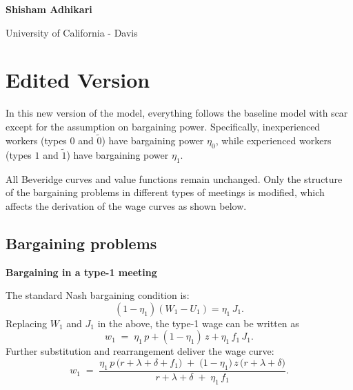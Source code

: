 \documentclass[12pt]{article} %
\theoremstyle{definition}
\begin{document}



\vspace{0.5cm}

\noindent \normalsize  \textbf{Shisham Adhikari}

\noindent University of California - Davis

\vspace{0.7cm}


\normalsize

\section*{Edited Version}

In this new version of the model, everything follows the baseline model with scar except for the assumption on bargaining power. Specifically, inexperienced workers (types \(0\) and \(\tilde{0}\)) have bargaining power \(\eta_0\), while experienced workers (types \(1\) and \(\tilde{1}\)) have bargaining power \(\eta_1\). 

All Beveridge curves and value functions remain unchanged. Only the structure of the bargaining problems in different types of meetings is modified, which affects the derivation of the wage curves as shown below.

\subsection*{Bargaining problems}\label{section bargaining}

\noindent \textbf{Bargaining in a type-1 meeting}

\medskip

\noindent The standard Nash bargaining condition is:
\begin{equation}
(1-\eta_1)(W_1 - U_1) = \eta_1 \, J_1. \label{eq bargain 1_mod}
\end{equation}
Replacing $W_1$ and $J_1$ in the above, the type-1 wage can be written as
\[
w_1 \;=\; \eta_1 \, p + (1-\eta_1)\,z + \eta_1 \, f_1 \, J_1.
\]
Further substitution and rearrangement deliver the wage curve:
\begin{equation}
w_1 \;=\; \frac{\eta_1 \, p \,\bigl(r+\lambda+\delta+f_1\bigr)\;+\;\bigl(1-\eta_1\bigr)\,z\,\bigl(r+\lambda+\delta\bigr)}{r+\lambda+\delta\;+\;\eta_1\, f_1}.
\label{eq WC 1_mod}
\end{equation}
\end{document}
